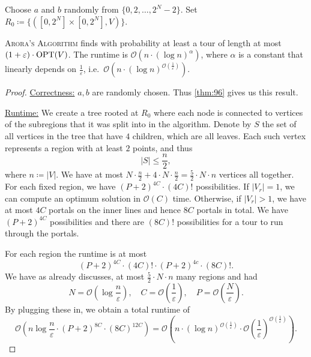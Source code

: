 \documentclass[../skript.tex]{subfiles}
\begin{document}
\vspace{-7pt}
\begin{algorithm}[H]
Choose $a$ and $b$ randomly from $\{ 0, 2, \ldots, 2^N - 2 \}$.\;
Set $R_0 \coloneqq \{ ([0, 2^N] \times [0, 2^N], V) \}$.\;
\end{algorithm}
\vspace{-7pt}
\EndAlgorithmLine
\begin{theorem} %
\label{thm:97}
\textsc{Arora's Algorithm} finds with probability at least  a tour of length at most $(1 + \varepsilon) \cdot \operatorname{OPT}(V)$.
The runtime is $\mathcal{O}(n \cdot (\log n)^\alpha)$, where $\alpha$ is a constant that linearly depends on $\frac{1}{\varepsilon}$, i.e.\ $\mathcal{O}(n \cdot (\log n)^{\mathcal{O}\left( \frac{1}{\varepsilon} \right)})$.
\end{theorem}
\begin{proof}
\underline{Correctness:} $a, b$ are randomly chosen. Thus \cref{thm:96} gives us this result.

\underline{Runtime:} We create a tree rooted at $R_0$ where each node is connected to vertices of the subregions that it was split into in the algorithm.
Denote by $S$ the set of all vertices in the tree that have $4$ children, which are all leaves.
Each such vertex represents a region with at least $2$ points, and thus
\[
	|S| \leq \frac{n}{2},
\]
where $n \coloneqq |V|$.
We have at most $N \cdot \frac{n}{2} + 4 \cdot N \cdot \frac{n}{2} = \frac{5}{2} \cdot N \cdot n$ vertices all together.
For each fixed region, we have $(P+2)^{4C} \cdot (4C)!$ possibilities.
If $|V_r| = 1$, we can compute an optimum solution in $\mathcal{O}(C)$ time.
Otherwise, if $|V_r| > 1$, we have at most $4C$ portals on the inner lines and hence $8C$ portals in total.
We have $(P+2)^{4C}$ possibilities and there are $(8C)!$ possibilities for a tour to run through the portals.

For each region the runtime is at most
\[
	(P+2)^{4C} \cdot (4C)! \cdot (P+2)^{4c} \cdot (8C)!.
\]
We have as already discusses, at most $\frac{5}{2} \cdot N \cdot n$ many regions and had
\[
	N = \mathcal{O} \left( \log \frac{n}{\varepsilon} \right), \quad C = \mathcal{O}\left( \frac{1}{\varepsilon} \right), \quad P = \mathcal{O} \left( \frac{N}{\varepsilon} \right).
\]
By plugging these in, we obtain a total runtime of
\[
\mathcal{O} \left( n \log \frac{n}{\varepsilon} \cdot (P+2)^{8C} \cdot (8C)^{12C} \right) = \mathcal{O} \left( n \cdot (\log n)^{\mathcal{O}\left( \frac{1}{\varepsilon} \right)} \cdot \mathcal{O}\left( \frac{1}{\varepsilon} \right)^{\mathcal{O}\left( \frac{1}{\varepsilon} \right)} \right).
\]
\end{proof}
\end{document}
